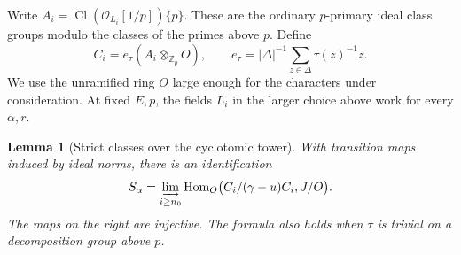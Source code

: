 \documentclass[a4paper,11pt]{article}
\newtheorem{lemma}[proposition]{Lemma}
\theoremstyle{definition}
\theoremstyle{remark}
\newcommand{\ZZ}{\mathbb Z}\newcommand{\ord}{\operatorname{ord}}
\numberwithin{equation}{section}
\newcommand{\Cl}{\operatorname{Cl}}
\begin{document}
Write \(A_i=\Cl(\mathcal O_{L_i}[1/p])\{p\}\). These are the
ordinary \(p\)-primary ideal class groups modulo the classes of
the primes above \(p\). Define
\[
 C_i=e_\tau(A_i\otimes_{\ZZ_p}O),\qquad
 e_\tau=|\Delta|^{-1}\sum_{z\in\Delta}\tau(z)^{-1}z .
\]
We use the unramified ring \(O\) large enough for the characters
under consideration. At fixed \(E,p\), the fields \(L_i\) in the
larger choice above work for every \(\alpha,r\).

\begin{lemma}[Strict classes over the cyclotomic tower]\label{lem:direct191}
With transition maps induced by ideal norms, there is an identification
\begin{equation}
 S_\alpha=\varinjlim_{i\ge n_0}
     \operatorname{Hom}_O\!\big(C_i/(\gamma-u)C_i,J/O\big).
 \label{eq:direct191}
\end{equation}
The maps on the right are injective. The formula also holds when
\(\tau\) is trivial on a decomposition group above \(p\).
\end{lemma}
\end{document}
